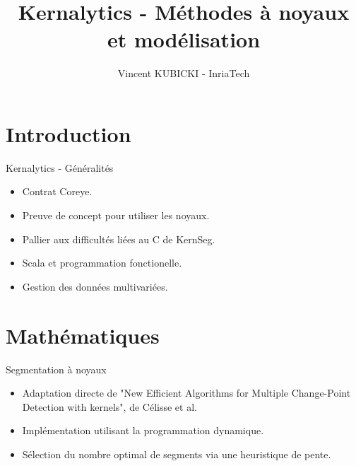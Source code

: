 \documentclass{beamer}
\title[Kernalytics]{Kernalytics - Méthodes à noyaux et modélisation}
\author[VK]{Vincent KUBICKI - InriaTech}
\institute[Inria]{Inria Lille - Nord Europe}
\begin{document}
\begin{frame}[plain]
	\titlepage
\end{frame}

\section{Introduction}

\begin{frame}{Kernalytics - Généralités}
	\begin{itemize}
		\item Contrat Coreye.
		\item Preuve de concept pour utiliser les noyaux.
		\item Pallier aux difficultés liées au C de KernSeg.
		\item Scala et programmation fonctionelle.
		\item Gestion des données multivariées.
	\end{itemize}
\end{frame}

\section{Mathématiques}

\begin{frame}{Segmentation à noyaux}
	\begin{itemize}
		\item Adaptation directe de "New Efficient Algorithms for Multiple Change-Point Detection with kernels", de Célisse et al.
		\item Implémentation utilisant la programmation dynamique.
		\item Sélection du nombre optimal de segments via une heuristique de pente.
	\end{itemize}
\end{frame}
\end{document}
